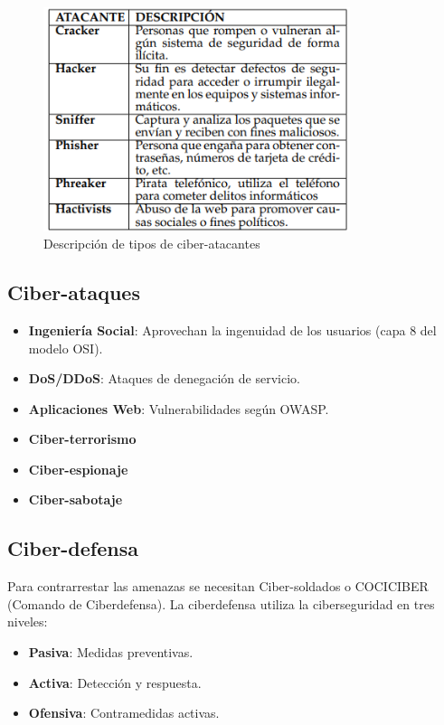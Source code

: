 \documentclass[12pt,a4paper]{article}
\begin{document}
\begin{figure}[H]
    \centering
    \includegraphics[width=0.8\textwidth]{atacante_descripcion.png}
    \caption{Descripción de tipos de ciber-atacantes}
    \label{fig:atacantes}
\end{figure}

\subsection{Ciber-ataques}
\begin{itemize}
    \item \textbf{Ingeniería Social}: Aprovechan la ingenuidad de los usuarios (capa 8 del modelo OSI).
    \item \textbf{DoS/DDoS}: Ataques de denegación de servicio.
    \item \textbf{Aplicaciones Web}: Vulnerabilidades según OWASP.
    \item \textbf{Ciber-terrorismo}
    \item \textbf{Ciber-espionaje}
    \item \textbf{Ciber-sabotaje}
\end{itemize}

\subsection{Ciber-defensa}
Para contrarrestar las amenazas se necesitan Ciber-soldados o COCICIBER (Comando de Ciberdefensa). La ciberdefensa utiliza la ciberseguridad en tres niveles:
\begin{itemize}
    \item \textbf{Pasiva}: Medidas preventivas.
    \item \textbf{Activa}: Detección y respuesta.
    \item \textbf{Ofensiva}: Contramedidas activas.
\end{itemize}
\end{document}
